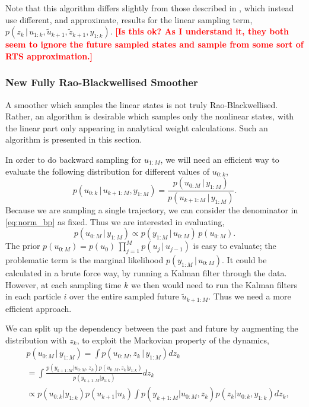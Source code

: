 \documentclass[twocolumn]{autart}    %
\newcommand{\comment}[1]{\textcolor{red}{\textbf{[#1]}}}
\begin{document}
Note that this algorithm differs slightly from those described in \cite{Fong+Godsill+Doucet+West:2002,Lindsten+Schon:2011}, which instead use different, and approximate, results for the linear sampling term, $p(z_k\,|\, u_{1:k}, \tilde{u}_{k+1}, \tilde{z}_{k+1},y_{1:k})$. \comment{Is this ok? As I understand it, they both seem to ignore the future sampled states and sample from some sort of RTS approximation.}



\subsubsection{New Fully Rao-Blackwellised Smoother}

A smoother which samples the linear states is not truly Rao-Blackwellised. Rather, an algorithm is desirable which samples only the nonlinear states, with the linear part only appearing in analytical weight calculations. Such an algorithm is presented in this section.

In order to do backward sampling for $u_{1:M}$, we will need an efficient way to evaluate the following distribution for different values of $u_{0:k}$,
%
\begin{equation}
  p(u_{0:k}\,|\,u_{k+1:M},y_{1:M})
  = \frac{p(u_{0:M}\,|\,y_{1:M})}{p(u_{k+1:M}\,|\,y_{1:M})}.
\label{eq:norm_bp}
\end{equation}
%
Because we are sampling a single trajectory, we can consider the denominator in \eqref{eq:norm_bp} as fixed. Thus we are interested in
evaluating,
%
\begin{equation}
  p(u_{0:M}\,|\,y_{1:M}) \propto p(y_{1:M}\,|\,u_{0:M}) \, p(u_{0:M}).
\end{equation}
%
The prior $p(u_{0:M}) = p(u_0) \, \prod_{j=1}^M p(u_{j}\,|\,u_{j-1})$ is easy to evaluate; the problematic term is the marginal likelihood $p(y_{1:M}\,|\,u_{0:M})$. It could be calculated in a brute force way, by running a Kalman filter through the data.  However, at each sampling time $k$ we then would need to run the Kalman filters in each particle $i$ over the entire sampled future $\tilde{u}_{k+1:M}$. Thus we need a more efficient approach.

We can split up the dependency between the past and future by augmenting the distribution with $z_k$, to exploit the Markovian property of the dynamics,
%
\begin{equation}
\begin{split}
  & p(u_{0:M}\,|\,y_{1:M}) = \int p(u_{0:M}, z_k \,|\,y_{1:M}) dz_k \\
  &= \int \frac{ p(y_{k+1:M} | u_{0:M}, z_k) p(u_{0:M}, z_k | y_{1:k}) }{ p(y_{k+1:M} | y_{1:k}) } dz_k \\
  &\propto p(u_{0:k} | y_{1:k}) p(u_{k+1} | u_{k}) \int p(y_{k+1:M} | u_{0:M}, z_k) p(z_k | u_{0:k}, y_{1:k}) dz_k    ,
\end{split}
\label{eq:split}
\end{equation}
\end{document}
